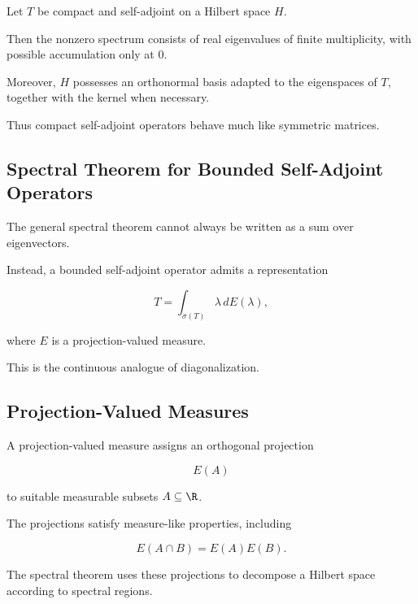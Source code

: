 \begin{theorem}
Let \(T\) be compact and self-adjoint on a Hilbert space \(H\).

Then the nonzero spectrum consists of real eigenvalues of finite
multiplicity, with possible accumulation only at \(0\).

Moreover, \(H\) possesses an orthonormal basis adapted to the eigenspaces
of \(T\), together with the kernel when necessary.
\end{theorem}

Thus compact self-adjoint operators behave much like symmetric matrices.

\subsection{Spectral Theorem for Bounded Self-Adjoint Operators}
\label{subsec:bounded-self-adjoint-spectral}

The general spectral theorem cannot always be written as a sum over
eigenvectors.

Instead, a bounded self-adjoint operator admits a representation

\[
\boxed{
T
=
\int_{\sigma(T)}
\lambda\,dE(\lambda),
}
\]

where \(E\) is a projection-valued measure.

This is the continuous analogue of diagonalization.

\subsection{Projection-Valued Measures}
\label{subsec:projection-valued-measures}

A projection-valued measure assigns an orthogonal projection

\[
E(A)
\]

to suitable measurable subsets \(A\subseteq\R\).

The projections satisfy measure-like properties, including

\[
\boxed{
E(A\cap B)
=
E(A)E(B).
}
\]

The spectral theorem uses these projections to decompose a Hilbert space
according to spectral regions.

